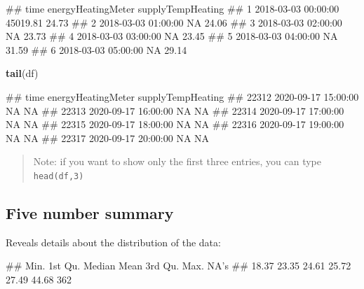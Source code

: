 \documentclass[
  a4paperpaper,
]{book}
\newenvironment{Shaded}{\begin{snugshade}}{\end{snugshade}}
\newcommand{\KeywordTok}[1]{\textcolor[rgb]{0.13,0.29,0.53}{\textbf{#1}}}
\newcommand{\NormalTok}[1]{#1}
\newcommand{\OperatorTok}[1]{\textcolor[rgb]{0.81,0.36,0.00}{\textbf{#1}}}
\let\oldShaded\Shaded
\let\endoldShaded\endShaded
\renewenvironment{Shaded}{\footnotesize\oldShaded}{\endoldShaded}
\let\oldverbatim\verbatim
\let\endoldverbatim\endverbatim
\renewenvironment{verbatim}{\footnotesize\oldverbatim}{\endoldverbatim}
\begin{document}
\begin{verbatim}
##                  time energyHeatingMeter supplyTempHeating
## 1 2018-03-03 00:00:00           45019.81             24.73
## 2 2018-03-03 01:00:00                 NA             24.06
## 3 2018-03-03 02:00:00                 NA             23.73
## 4 2018-03-03 03:00:00                 NA             23.45
## 5 2018-03-03 04:00:00                 NA             31.59
## 6 2018-03-03 05:00:00                 NA             29.14
\end{verbatim}

\begin{Shaded}
\begin{Highlighting}[]
\KeywordTok{tail}\NormalTok{(df)}
\end{Highlighting}
\end{Shaded}

\begin{verbatim}
##                      time energyHeatingMeter supplyTempHeating
## 22312 2020-09-17 15:00:00                 NA                NA
## 22313 2020-09-17 16:00:00                 NA                NA
## 22314 2020-09-17 17:00:00                 NA                NA
## 22315 2020-09-17 18:00:00                 NA                NA
## 22316 2020-09-17 19:00:00                 NA                NA
## 22317 2020-09-17 20:00:00                 NA                NA
\end{verbatim}

\begin{quote}
Note: if you want to show only the first three entries, you can type \texttt{head(df,3)}
\end{quote}

\hypertarget{five-number-summary}{%
\subsection{Five number summary}\label{five-number-summary}}

Reveals details about the distribution of the data:

\begin{Shaded}
\end{Shaded}

\begin{verbatim}
##    Min. 1st Qu.  Median    Mean 3rd Qu.    Max.    NA's 
##   18.37   23.35   24.61   25.72   27.49   44.68     362
\end{verbatim}
\end{document}
